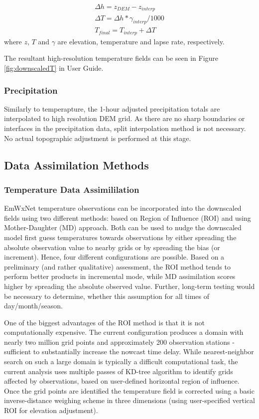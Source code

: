 \documentclass{article}
\begin{document}
\begin{eqnarray}
\Delta h = z_{DEM} - z_{interp} \nonumber \\
\Delta T = \Delta h * \gamma_{interp}/1000  \nonumber\\
T_{final} = T_{interp} + \Delta T
\end{eqnarray}
where $z$, $T$ and $\gamma$ are elevation, temperature and lapse rate, respectively. 

The resultant high-resolution temperature fields can be seen in Figure \ref{fig:downscaledT} in User Guide. 

\subsubsection{Precipitation}
Similarly to temperapture, the 1-hour adjusted precipitation totals are interpolated to high resolution DEM grid. As there are no sharp boundaries or interfaces in the precipitation data, split interpolation method is not necessary. No actual topographic adjustment is performed at this stage.  

\FloatBarrier
\subsection{Data Assimilation Methods}
\subsubsection{Temperature Data Assimililation}
EmWxNet temperature observations can be incorporated into the downscaled fields using two different methods: based on Region of Influence (ROI) and using Mother-Daughter (MD) approach. Both can be used to nudge the downscaled model first guess temperatures towards observations by either spreading the absolute observation value to nearby grids or by spreading the bias (or increment). Hence, four different configurations are possible. Based on a preliminary (and rather qualitative) assessment, the ROI method tends to perform better products in incremental mode, while MD assimilation scores higher by spreading the absolute observed value. Further, long-term testing would be necessary to determine, whether this assumption for all times of day/month/season. 

One of the biggest advantages of the ROI method is that it is not computationally expensive. The current configuration produces a domain with nearly two million grid points and approximately 200 observation stations - sufficient to substantially increase the nowcast time delay. While nearest-neighbor search on such a large domain is typically a difficult computational task, the current analysis uses multiple passes of KD-tree algorithm \cite{KDtrees} to identify grids affected by observations, based on user-defined horizontal region of influence. Once the grid points are identified the temperature field is corrected using a basic inverse-distance weighing scheme in three dimensions (using user-specified vertical ROI for elevation adjustment).\\
\end{document}
